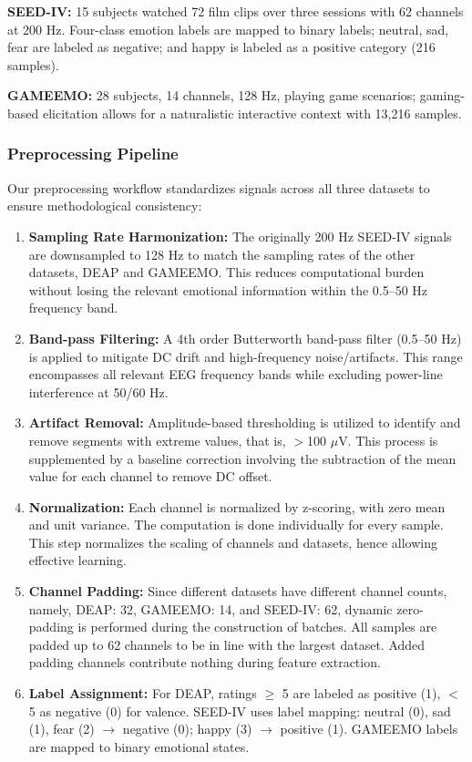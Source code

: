 \documentclass[conference]{IEEEtran}
\begin{document}
\textbf{SEED-IV:} 15 subjects watched 72 film clips over three sessions with 62 channels at 200 Hz. Four-class emotion labels are mapped to binary labels; neutral, sad, fear are labeled as negative; and happy is labeled as a positive category (216 samples).

\textbf{GAMEEMO:} 28 subjects, 14 channels, 128 Hz, playing game scenarios; gaming-based elicitation allows for a naturalistic interactive context with 13,216 samples.

\subsubsection{Preprocessing Pipeline}

Our preprocessing workflow standardizes signals across all three datasets to ensure methodological consistency:

\begin{enumerate}
    \item \textbf{Sampling Rate Harmonization:} The originally 200 Hz SEED-IV signals are downsampled to 128 Hz to match the sampling rates of the other datasets, DEAP and GAMEEMO. This reduces computational burden without losing the relevant emotional information within the 0.5–50 Hz frequency band.
    
    \item \textbf{Band-pass Filtering:} A 4th order Butterworth band-pass filter (0.5–50 Hz) is applied to mitigate DC drift and high-frequency noise/artifacts. This range encompasses all relevant EEG frequency bands while excluding power-line interference at 50/60 Hz.
    
    \item \textbf{Artifact Removal:} Amplitude-based thresholding is utilized to identify and remove segments with extreme values, that is, $>$100 $\mu$V. This process is supplemented by a baseline correction involving the subtraction of the mean value for each channel to remove DC offset.
    
    \item \textbf{Normalization:} Each channel is normalized by z-scoring, with zero mean and unit variance. The computation is done individually for every sample. This step normalizes the scaling of channels and datasets, hence allowing effective learning.
    
    \item \textbf{Channel Padding:} Since different datasets have different channel counts, namely, DEAP: 32, GAMEEMO: 14, and SEED-IV: 62, dynamic zero-padding is performed during the construction of batches. All samples are padded up to 62 channels to be in line with the largest dataset. Added padding channels contribute nothing during feature extraction.
    
    \item \textbf{Label Assignment:} For DEAP, ratings $\geq$ 5 are labeled as positive (1), $<$ 5 as negative (0) for valence. SEED-IV uses label mapping: neutral (0), sad (1), fear (2) $\rightarrow$ negative (0); happy (3) $\rightarrow$ positive (1). GAMEEMO labels are mapped to binary emotional states.
\end{enumerate}
\end{document}
